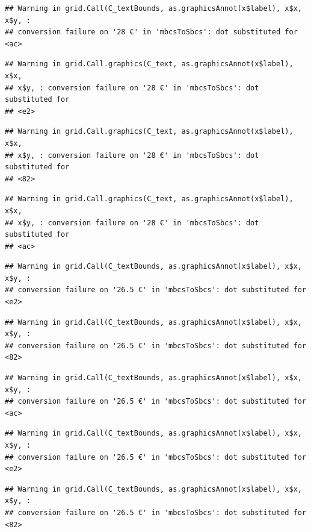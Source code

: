 \documentclass[]{gitbook}
\begin{document}
\begin{verbatim}
## Warning in grid.Call(C_textBounds, as.graphicsAnnot(x$label), x$x, x$y, :
## conversion failure on '28 €' in 'mbcsToSbcs': dot substituted for <ac>
\end{verbatim}

\begin{verbatim}
## Warning in grid.Call.graphics(C_text, as.graphicsAnnot(x$label), x$x,
## x$y, : conversion failure on '28 €' in 'mbcsToSbcs': dot substituted for
## <e2>
\end{verbatim}

\begin{verbatim}
## Warning in grid.Call.graphics(C_text, as.graphicsAnnot(x$label), x$x,
## x$y, : conversion failure on '28 €' in 'mbcsToSbcs': dot substituted for
## <82>
\end{verbatim}

\begin{verbatim}
## Warning in grid.Call.graphics(C_text, as.graphicsAnnot(x$label), x$x,
## x$y, : conversion failure on '28 €' in 'mbcsToSbcs': dot substituted for
## <ac>
\end{verbatim}

\begin{verbatim}
## Warning in grid.Call(C_textBounds, as.graphicsAnnot(x$label), x$x, x$y, :
## conversion failure on '26.5 €' in 'mbcsToSbcs': dot substituted for <e2>
\end{verbatim}

\begin{verbatim}
## Warning in grid.Call(C_textBounds, as.graphicsAnnot(x$label), x$x, x$y, :
## conversion failure on '26.5 €' in 'mbcsToSbcs': dot substituted for <82>
\end{verbatim}

\begin{verbatim}
## Warning in grid.Call(C_textBounds, as.graphicsAnnot(x$label), x$x, x$y, :
## conversion failure on '26.5 €' in 'mbcsToSbcs': dot substituted for <ac>
\end{verbatim}

\begin{verbatim}
## Warning in grid.Call(C_textBounds, as.graphicsAnnot(x$label), x$x, x$y, :
## conversion failure on '26.5 €' in 'mbcsToSbcs': dot substituted for <e2>
\end{verbatim}

\begin{verbatim}
## Warning in grid.Call(C_textBounds, as.graphicsAnnot(x$label), x$x, x$y, :
## conversion failure on '26.5 €' in 'mbcsToSbcs': dot substituted for <82>
\end{verbatim}
\end{document}
